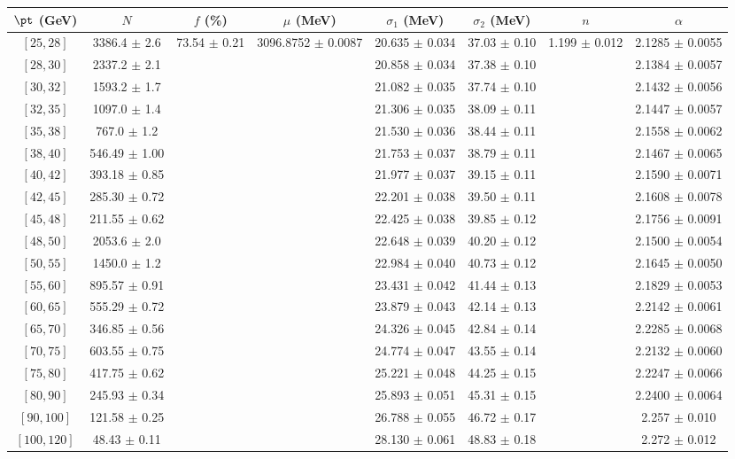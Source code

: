 \begin{tabular}{c||c|c|c|c|c|c|c}
$\pt$ (GeV) & $N$ & $f$ (\%) & $\mu$ (MeV) & $\sigma_1$ (MeV) & $\sigma_2$ (MeV) & $n$ & $\alpha$ \\
\hline
$[25, 28]$ & 3386.4 $\pm$ 2.6 & \multirow{19}{*}{73.54 $\pm$ 0.21} & \multirow{19}{*}{3096.8752 $\pm$ 0.0087} & 20.635 $\pm$ 0.034 & 37.03 $\pm$ 0.10 & \multirow{19}{*}{1.199 $\pm$ 0.012} & 2.1285 $\pm$ 0.0055\\
$[28, 30]$ & 2337.2 $\pm$ 2.1 &  &  & 20.858 $\pm$ 0.034 & 37.38 $\pm$ 0.10 &  & 2.1384 $\pm$ 0.0057\\
$[30, 32]$ & 1593.2 $\pm$ 1.7 &  &  & 21.082 $\pm$ 0.035 & 37.74 $\pm$ 0.10 &  & 2.1432 $\pm$ 0.0056\\
$[32, 35]$ & 1097.0 $\pm$ 1.4 &  &  & 21.306 $\pm$ 0.035 & 38.09 $\pm$ 0.11 &  & 2.1447 $\pm$ 0.0057\\
$[35, 38]$ & 767.0 $\pm$ 1.2 &  &  & 21.530 $\pm$ 0.036 & 38.44 $\pm$ 0.11 &  & 2.1558 $\pm$ 0.0062\\
$[38, 40]$ & 546.49 $\pm$ 1.00 &  &  & 21.753 $\pm$ 0.037 & 38.79 $\pm$ 0.11 &  & 2.1467 $\pm$ 0.0065\\
$[40, 42]$ & 393.18 $\pm$ 0.85 &  &  & 21.977 $\pm$ 0.037 & 39.15 $\pm$ 0.11 &  & 2.1590 $\pm$ 0.0071\\
$[42, 45]$ & 285.30 $\pm$ 0.72 &  &  & 22.201 $\pm$ 0.038 & 39.50 $\pm$ 0.11 &  & 2.1608 $\pm$ 0.0078\\
$[45, 48]$ & 211.55 $\pm$ 0.62 &  &  & 22.425 $\pm$ 0.038 & 39.85 $\pm$ 0.12 &  & 2.1756 $\pm$ 0.0091\\
$[48, 50]$ & 2053.6 $\pm$ 2.0 &  &  & 22.648 $\pm$ 0.039 & 40.20 $\pm$ 0.12 &  & 2.1500 $\pm$ 0.0054\\
$[50, 55]$ & 1450.0 $\pm$ 1.2 &  &  & 22.984 $\pm$ 0.040 & 40.73 $\pm$ 0.12 &  & 2.1645 $\pm$ 0.0050\\
$[55, 60]$ & 895.57 $\pm$ 0.91 &  &  & 23.431 $\pm$ 0.042 & 41.44 $\pm$ 0.13 &  & 2.1829 $\pm$ 0.0053\\
$[60, 65]$ & 555.29 $\pm$ 0.72 &  &  & 23.879 $\pm$ 0.043 & 42.14 $\pm$ 0.13 &  & 2.2142 $\pm$ 0.0061\\
$[65, 70]$ & 346.85 $\pm$ 0.56 &  &  & 24.326 $\pm$ 0.045 & 42.84 $\pm$ 0.14 &  & 2.2285 $\pm$ 0.0068\\
$[70, 75]$ & 603.55 $\pm$ 0.75 &  &  & 24.774 $\pm$ 0.047 & 43.55 $\pm$ 0.14 &  & 2.2132 $\pm$ 0.0060\\
$[75, 80]$ & 417.75 $\pm$ 0.62 &  &  & 25.221 $\pm$ 0.048 & 44.25 $\pm$ 0.15 &  & 2.2247 $\pm$ 0.0066\\
$[80, 90]$ & 245.93 $\pm$ 0.34 &  &  & 25.893 $\pm$ 0.051 & 45.31 $\pm$ 0.15 &  & 2.2400 $\pm$ 0.0064\\
$[90, 100]$ & 121.58 $\pm$ 0.25 &  &  & 26.788 $\pm$ 0.055 & 46.72 $\pm$ 0.17 &  & 2.257 $\pm$ 0.010\\
$[100, 120]$ & 48.43 $\pm$ 0.11 &  &  & 28.130 $\pm$ 0.061 & 48.83 $\pm$ 0.18 &  & 2.272 $\pm$ 0.012\\
\end{tabular}

